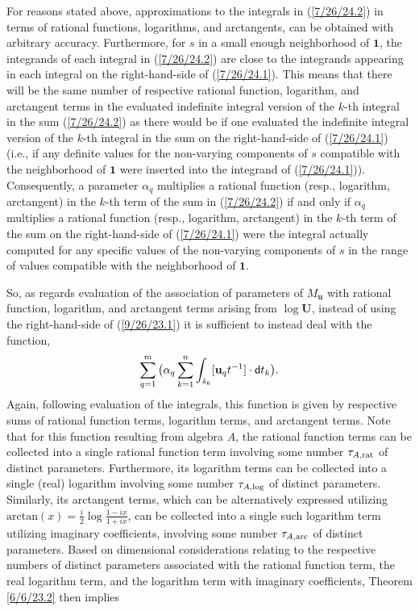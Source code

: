 \documentclass{amsart}
\numberwithin{equation}{section}
\theoremstyle{definition}
\numberwithin{theorem}{section}
\begin{document}
For reasons stated above, approximations to the integrals in (\ref{7/26/24.2}) in terms of rational functions, logarithms, and arctangents, can be obtained with arbitrary accuracy.  Furthermore, for $s$ in a small enough neighborhood of $\mathbf{1}$, the integrands of each integral in (\ref{7/26/24.2}) are close to the integrands appearing in each integral on the right-hand-side of (\ref{7/26/24.1}).  This means that there will be the same number of respective rational function, logarithm, and arctangent terms in the evaluated indefinite integral version of the $k$-th integral in the sum (\ref{7/26/24.2}) as there would be if one evaluated the indefinite integral version of the $k$-th integral in the sum on the right-hand-side of (\ref{7/26/24.1}) (i.e., if any definite values for the non-varying components of $s$ compatible with the neighborhood of $\mathbf{1}$ were inserted into the integrand of (\ref{7/26/24.1})).  Consequently, a parameter $\alpha_q$ multiplies a rational function (resp., logarithm, arctangent) in the $k$-th term of the sum in (\ref{7/26/24.2}) if and only if $\alpha_q$ multiplies a rational function (resp., logarithm, arctangent) in the $k$-th term of the sum on the right-hand-side of (\ref{7/26/24.1}) were the integral actually computed for any specific values of the non-varying components of $s$ in the range of values compatible with the neighborhood of $\mathbf{1}$.  

So, as regards evaluation of the association of parameters of $M_{\mathbf{u}}$ with rational function, logarithm, and arctangent terms arising from $\log\mathbf{U}$, instead of using the right-hand-side of (\ref{9/26/23.1}) it is sufficient to instead deal with the function,
\begin{equation}\label{7/29/24.1} \sum_{q=1}^m \big(\alpha_q\sum_{k=1}^n \int_{\hat{s}_k} [\mathbf{u}_q t^{-1}]\cdot {\sf d}t_k\big).\end{equation} Again, following evaluation of the integrals, this function is given by respective sums of rational function terms, logarithm terms, and arctangent terms.  Note that for this function resulting from algebra $A$, the rational function terms can be collected into a single rational function term involving some number $\tau_{A,{\rm rat}}$ of distinct parameters.  Furthermore, its logarithm terms can be collected into a single (real) logarithm involving some number $\tau_{A,{\rm log}}$ of distinct parameters.  Similarly, its arctangent terms, which can be alternatively expressed utilizing $\text{arctan}(x) = \frac{i}{2}\log\frac{1-ix}{1+ix}$, can be collected into a single such logarithm term utilizing imaginary coefficients, involving some number $\tau_{A,{\rm arc}}$ of distinct parameters. 
Based on dimensional considerations relating to the respective numbers of distinct parameters associated with the rational function term, the real logarithm term, and the logarithm term with imaginary coefficients, Theorem \ref{6/6/23.2} then implies
\end{document}
